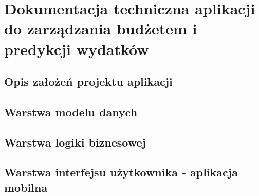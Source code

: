 \chapter{Dokumentacja techniczna aplikacji do zarządzania budżetem i predykcji wydatków}
\section{Opis założeń projektu aplikacji}
\section{Warstwa modelu danych}
\section{Warstwa logiki biznesowej}
\section{Warstwa interfejsu użytkownika - aplikacja mobilna}
